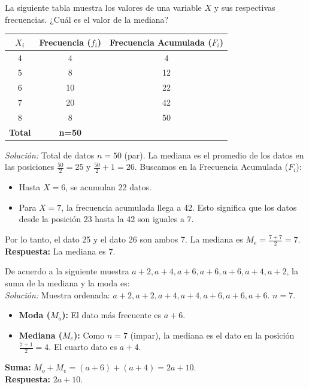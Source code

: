 \documentclass[12pt, letterpaper]{article}
\begin{document}
\vspace{1em}
\noindent La siguiente tabla muestra los valores de una variable \(X\) y sus respectivas frecuencias. ¿Cuál es el valor de la mediana?
\begin{center}
	\begin{tabular}{|c|c|c|}
		\hline
		\textbf{\(X_i\)} & \textbf{Frecuencia ($f_i$)} & \textbf{Frecuencia Acumulada ($F_i$)} \\
		\hline
		4                & 4                           & 4                                     \\
		\hline
		5                & 8                           & 12                                    \\
		\hline
		6                & 10                          & 22                                    \\
		\hline
		7                & 20                          & 42                                    \\
		\hline
		8                & 8                           & 50                                    \\
		\hline
		\textbf{Total}   & \textbf{n=50}               &                                       \\
		\hline
	\end{tabular}
\end{center}
\textit{Solución:}
Total de datos $n=50$ (par). La mediana es el promedio de los datos en las posiciones $\frac{50}{2}=25$ y $\frac{50}{2}+1 = 26$.
Buscamos en la Frecuencia Acumulada ($F_i$):
\begin{itemize}
	\item Hasta $X=6$, se acumulan 22 datos.
	\item Para $X=7$, la frecuencia acumulada llega a 42. Esto significa que los datos desde la posición 23 hasta la 42 son iguales a 7.
\end{itemize}
Por lo tanto, el dato 25 y el dato 26 son ambos 7.
La mediana es $M_e = \frac{7+7}{2} = 7$. \\
\textbf{Respuesta:} La mediana es 7.

\vspace{1em}
\noindent De acuerdo a la siguiente muestra \(a+2, a+4, a+6, a+6, a+6, a+4, a+2\), la suma de la mediana y la moda es: \\
\textit{Solución:}
Muestra ordenada: \(a+2, a+2, a+4, a+4, a+6, a+6, a+6\). $n=7$.
\begin{itemize}
	\item \textbf{Moda ($M_o$):} El dato más frecuente es \(a+6\).
	\item \textbf{Mediana ($M_e$):} Como $n=7$ (impar), la mediana es el dato en la posición $\frac{7+1}{2}=4$. El cuarto dato es \(a+4\).
\end{itemize}
\textbf{Suma:} $M_o + M_e = (a+6) + (a+4) = 2a+10$.\\
\textbf{Respuesta:} $2a+10$.
\end{document}
